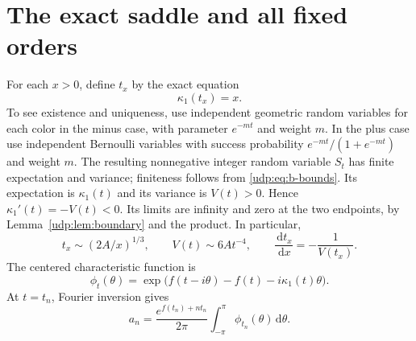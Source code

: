 \documentclass[11pt]{article}
\theoremstyle{remark}\newtheorem{remark}[theorem]{Remark}
\newcommand{\dd}{\,\mathrm d}
\numberwithin{equation}{section}
\begin{document}
\section{The exact saddle and all fixed orders}\label{udp:sec:saddle}
For each $x>0$, define $t_x$ by the exact equation
\begin{equation}\label{udp:eq:saddle}
 \kappa_1(t_x)=x.
\end{equation}
To see existence and uniqueness, use independent geometric random variables for each color in the minus case, with parameter $e^{-mt}$ and weight $m$. In the plus case use independent Bernoulli variables with success probability $e^{-mt}/(1+e^{-mt})$ and weight $m$. The resulting nonnegative integer random variable $S_t$ has finite expectation and variance; finiteness follows from \eqref{udp:eq:b-bounds}. Its expectation is $\kappa_1(t)$ and its variance is $V(t)>0$. Hence $\kappa_1'(t)=-V(t)<0$. Its limits are infinity and zero at the two endpoints, by Lemma~\ref{udp:lem:boundary} and the product. In particular,
\begin{equation}\label{udp:eq:scales}
 t_x\sim(2A/x)^{1/3},\qquad
 V(t)\sim6At^{-4},\qquad
 \frac{\dd t_x}{\dd x}=-\frac1{V(t_x)}.
\end{equation}
The centered characteristic function is
\begin{equation}\label{udp:eq:char}
 \phi_t(\theta)=\exp\bigl(f(t-i\theta)-f(t)-i\kappa_1(t)\theta\bigr).
\end{equation}
At $t=t_n$, Fourier inversion gives
\begin{equation}\label{udp:eq:fourier}
 a_n=\frac{e^{f(t_n)+nt_n}}{2\pi}
 \int_{-\pi}^{\pi}\phi_{t_n}(\theta)\dd\theta.
\end{equation}
\end{document}
